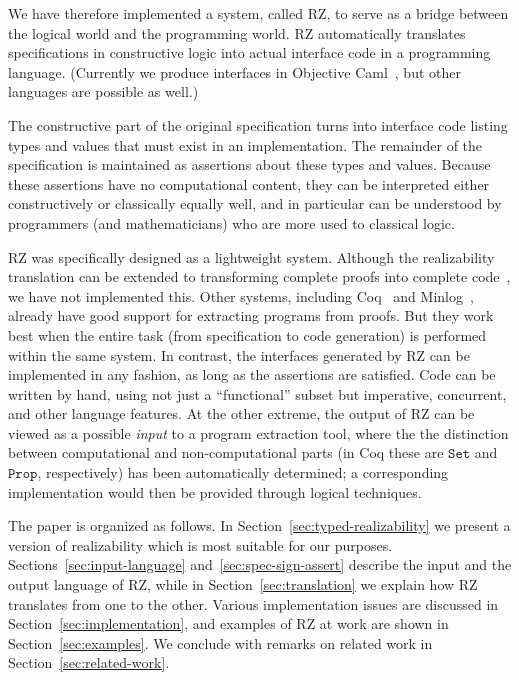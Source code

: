 We have therefore implemented a system, called RZ, to serve as a bridge between
the logical world and the programming world. RZ automatically translates
specifications in constructive logic into actual interface code in a
programming language. (Currently we produce interfaces in 
Objective Caml~\cite{ocaml}, but other languages are possible
as well.)

The constructive part of the original specification turns into interface code
listing types and values that must exist in an implementation. The remainder of
the specification is maintained as assertions about these types and values.
Because these assertions have no computational content, they can be interpreted
either constructively or classically equally well, and in particular can
be understood by programmers (and mathematicians) who are more used to
classical logic.


RZ was specifically designed as a lightweight system. Although the
realizability translation can be extended to transforming complete
proofs into complete code~\cite{komagata+:tr95}, we have not
implemented this. Other systems, including Coq~\cite{coqart} and
Minlog~\cite{benl98:_proof_theor_work}, already have good support for
extracting programs from proofs. But they work best when the entire
task (from specification to code generation) is performed within the
same system. In contrast, the interfaces generated by RZ can be
implemented in any fashion, as long as the assertions are satisfied.
Code can be written by hand, using not just a ``functional'' subset
but imperative, concurrent, and other language features. At the other
extreme, the output of RZ can be viewed as a possible \emph{input} to
a program extraction tool, where the the distinction between
computational and non-computational parts (in Coq these are
$\mathtt{Set}$ and $\mathtt{Prop}$, respectively) has been
automatically determined; a corresponding implementation would then be
provided through logical techniques.


The paper is organized as follows. In
Section~\ref{sec:typed-realizability} we present a version of
realizability which is most suitable for our purposes.
Sections~\ref{sec:input-language} and~\ref{sec:spec-sign-assert}
describe the input and the output language of RZ, while in
Section~\ref{sec:translation} we explain how RZ translates from one to
the other. Various implementation issues are discussed in
Section~\ref{sec:implementation}, and examples of RZ at work are shown
in Section~\ref{sec:examples}. We conclude with remarks on related
work in Section~\ref{sec:related-work}.


